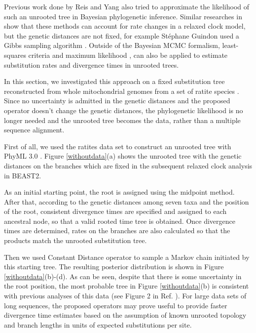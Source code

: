\documentclass{bmcart}
\begin{document}
Previous work done by Reis and Yang \cite{reis2011approximate} also tried to approximate the likelihood of such an unrooted tree in Bayesian phylogenetic inference. Similar researches in \cite{thorne1998estimating,guindon2010bayesian} show that these methods can account for rate changes in a relaxed clock model, but the genetic distances are not fixed, for example St{\'e}phane Guindon used a Gibbs sampling algorithm \cite{guindon2010bayesian}. Outside of the Bayesian MCMC formalism, least-squares criteria \cite{to2015fast} and maximum likelihood \cite{sagulenko2018treetime,sanderson2003r8s}, can also be applied to estimate substitution rates and divergence times in unrooted trees. 

In this section, we investigated this approach on a fixed substitution tree reconstructed from whole mitochondrial genomes from a set of ratite species \cite{cooper2001complete}. Since no uncertainty is admitted in the genetic distances and the proposed operator doesn't change the genetic distances, the phylogenetic likelihood is no longer needed and the unrooted tree becomes the data, rather than a multiple sequence alignment.

First of all, we used the ratites data set to construct an unrooted tree with PhyML 3.0 \cite{phyml,guindon2010new}.  Figure \ref{withoutdata}(a) shows the unrooted tree with the genetic distances on the branches which are fixed in the subsequent relaxed clock analysis in BEAST2.

As an initial starting point, the root is assigned using the midpoint method. After that, according to the genetic distances among seven taxa and the position of the root, consistent divergence times are specified and assigned to each ancestral node, so that a valid rooted time tree is obtained. Once divergence times are determined, rates on the branches are also calculated so that the products match the unrooted substitution tree.

Then we used Constant Distance operator to sample a Markov chain initiated by this starting tree. The resulting posterior distribution is shown in Figure \ref{withoutdata}(b)-(d). As can be seen, despite that there is some uncertainty in the root position, the most probable tree in Figure \ref{withoutdata}(b) is consistent with previous analyses of this data (see Figure 2 in Ref. \cite{cooper2001complete}). For large data sets of long sequences, the proposed operators may prove useful to provide faster divergence time estimates based on the assumption of known unrooted topology and branch lengths in units of expected substitutions per site.
\end{document}

